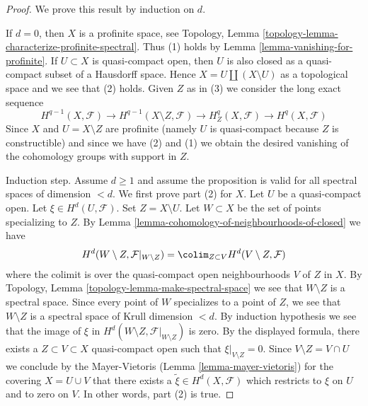 \begin{proof}
We prove this result by induction on $d$.

\medskip\noindent
If $d = 0$, then $X$ is a profinite space, see
Topology, Lemma \ref{topology-lemma-characterize-profinite-spectral}.
Thus (1) holds by Lemma \ref{lemma-vanishing-for-profinite}.
If $U \subset X$ is quasi-compact open, then $U$ is
also closed as a quasi-compact subset of a Hausdorff space.
Hence $X = U \amalg (X \setminus U)$ as a topological space
and we see that (2) holds. Given $Z$ as in (3) we consider the
long exact sequence
$$
H^{q - 1}(X, \mathcal{F}) \to
H^{q - 1}(X \setminus Z, \mathcal{F}) \to
H^q_Z(X, \mathcal{F}) \to H^q(X, \mathcal{F})
$$
Since $X$ and $U = X \setminus Z$ are profinite (namely $U$ is quasi-compact
because $Z$ is constructible) and since
we have (2) and (1) we obtain the desired vanishing of the
cohomology groups with support in $Z$.

\medskip\noindent
Induction step. Assume $d \geq 1$ and assume
the proposition is valid for all spectral
spaces of dimension $< d$. We first prove part (2) for $X$.
Let $U$ be a quasi-compact open. Let $\xi \in H^d(U, \mathcal{F})$.
Set $Z = X \setminus U$. Let $W \subset X$ be the set of points
specializing to $Z$. By
Lemma \ref{lemma-cohomology-of-neighbourhoods-of-closed} we have
$$
H^d(W \setminus Z, \mathcal{F}|_{W \setminus Z}) =
\colim_{Z \subset V} H^d(V \setminus Z, \mathcal{F})
$$
where the colimit is over the quasi-compact open neighbourhoods $V$
of $Z$ in $X$.
By Topology, Lemma \ref{topology-lemma-make-spectral-space} we see that
$W \setminus Z$ is a spectral space.
Since every point of $W$ specializes to a point of $Z$, we see that
$W \setminus Z$ is a spectral space of Krull dimension $< d$.
By induction hypothesis we see that the image of $\xi$ in
$H^d(W \setminus Z, \mathcal{F}|_{W \setminus Z})$ is zero.
By the displayed formula, there exists a $Z \subset V \subset X$
quasi-compact open such that $\xi|_{V \setminus Z} = 0$.
Since $V \setminus Z = V \cap U$ we conclude by the Mayer-Vietoris
(Lemma \ref{lemma-mayer-vietoris}) for the covering $X = U \cup V$
that there exists a $\tilde \xi \in H^d(X, \mathcal{F})$ which restricts
to $\xi$ on $U$ and to zero on $V$. In other words, part (2) is true.


\end{proof}
